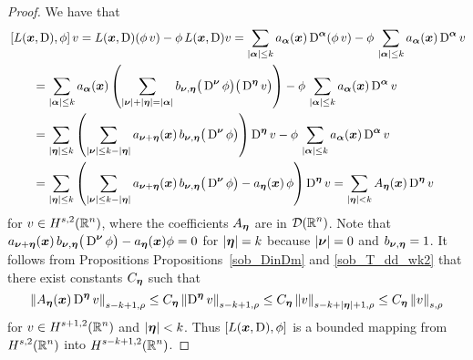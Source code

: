 \begin{proof}
We have that
\begin{align*}
&\left[ L({\bm{x}},\operatorname{D}), \phi\right] v
= L({\bm{x}},\operatorname{D}) (\phi\, v) - \phi\, L({\bm{x}},\operatorname{D}) v
= \sum_{|{\bm{\alpha}}|\leq k} a_{{\bm{\alpha}}}({\bm{x}})
\operatorname{D}^{{\bm{\alpha}}} (\phi\, v)
- \phi\, \sum_{|{\bm{\alpha}}|\leq k} a_{{\bm{\alpha}}}({\bm{x}})
\operatorname{D}^{{\bm{\alpha}}} v \\
&\qquad = \sum_{|{\bm{\alpha}}|\leq k} a_{{\bm{\alpha}}}({\bm{x}})
\left( \sum_{|{\bm{\nu}}|+|{\bm{\eta}}|=|{\bm{\alpha}}|}
b_{{\bm{\nu}},{\bm{\eta}}}
\big(\operatorname{D}^{{\bm{\nu}}} \phi\big)\big(\operatorname{D}^{{\bm{\eta}}} v\big) \right)
- \phi\, \sum_{|{\bm{\alpha}}|\leq k} a_{{\bm{\alpha}}}({\bm{x}})
\operatorname{D}^{{\bm{\alpha}}} v \\
&\qquad = \sum_{|{\bm{\eta}}|\leq k} \left(
\sum_{|{\bm{\nu}}|\leq k-|{\bm{\eta}}|} 
a_{{\bm{\nu}}+{\bm{\eta}}}({\bm{x}})\, b_{{\bm{\nu}},{\bm{\eta}}}
\big(\operatorname{D}^{{\bm{\nu}}} \phi\big) \right) \operatorname{D}^{{\bm{\eta}}} v
- \phi\, \sum_{|{\bm{\alpha}}|\leq k} a_{{\bm{\alpha}}}({\bm{x}})
\operatorname{D}^{{\bm{\alpha}}} v \\
&\qquad =\sum_{|{\bm{\eta}}|\leq k} \left(
\sum_{|{\bm{\nu}}|\leq k-|{\bm{\eta}}|} 
a_{{\bm{\nu}}+{\bm{\eta}}}({\bm{x}})\, b_{{\bm{\nu}},{\bm{\eta}}}
\big(\operatorname{D}^{{\bm{\nu}}} \phi\big) - a_{{\bm{\eta}}}({\bm{x}})\,\phi \right)
\operatorname{D}^{{\bm{\eta}}} v
= \sum_{|{\bm{\eta}}|< k} A_{{\bm{\eta}}}({\bm{x}}) \operatorname{D}^{{\bm{\eta}}} v
\end{align*}
for $\displaystyle v \in H^{s,2}(\mathbb{R}^n)$,
where the coefficients $A_{{\bm{\eta}}}$ are in $\displaystyle \mathcal{D}(\mathbb{R}^n)$.
Note that $\displaystyle a_{{\bm{\nu}}+{\bm{\eta}}}({\bm{x}})\,
b_{{\bm{\nu}},{\bm{\eta}}}
\big(\operatorname{D}^{{\bm{\nu}}} \phi\big) - a_{{\bm{\eta}}}({\bm{x}})\phi = 0$ for
$|{\bm{\eta}}| = k$ because $|{\bm{\nu}}|=0$ and
$b_{{\bm{\nu}},{\bm{\eta}}} = 1$.
It follows from Propositions Propositions~\ref{sob_DinDm} and
\ref{sob_T_dd_wk2} that there exist
constants $C_{{\bm{\eta}}}$ such that
\begin{equation} \label{ellRegInLem1Eq1}
\left\| A_{{\bm{\eta}}}({\bm{x}}) \operatorname{D}^{{\bm{\eta}}} v \right\|_{s-k+1,\rho}
\leq C_{{\bm{\eta}}} \left\| \operatorname{D}^{{\bm{\eta}}} v \right\|_{s-k+1,\rho}
\leq C_{{\bm{\eta}}} \left\| v \right\|_{s-k+|{\bm{\eta}}|+1,\rho}
\leq C_{{\bm{\eta}}} \left\| v \right\|_{s,\rho}
\end{equation}
for $\displaystyle v \in H^{s+1,2}(\mathbb{R}^n)$ and $|{\bm{\eta}}|<k$.  Thus
$\left[ L({\bm{x}},\operatorname{D}), \phi\right]$ is a bounded mapping from
$\displaystyle H^{s,2}(\mathbb{R}^n)$ into $\displaystyle H^{s-k+1,2}(\mathbb{R}^n)$.
\end{proof}

